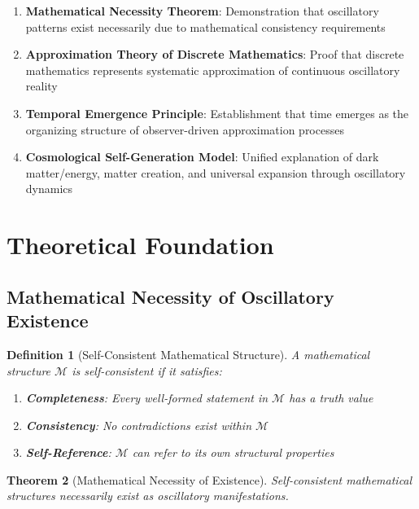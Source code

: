 \documentclass[11pt]{article}
\newtheorem{theorem}{Theorem}[section]
\newtheorem{definition}[theorem]{Definition}
\theoremstyle{remark}
\begin{document}
\begin{enumerate}
\item \textbf{Mathematical Necessity Theorem}: Demonstration that oscillatory patterns exist necessarily due to mathematical consistency requirements
\item \textbf{Approximation Theory of Discrete Mathematics}: Proof that discrete mathematics represents systematic approximation of continuous oscillatory reality
\item \textbf{Temporal Emergence Principle}: Establishment that time emerges as the organizing structure of observer-driven approximation processes
\item \textbf{Cosmological Self-Generation Model}: Unified explanation of dark matter/energy, matter creation, and universal expansion through oscillatory dynamics
\end{enumerate}

\section{Theoretical Foundation}

\subsection{Mathematical Necessity of Oscillatory Existence}

\begin{definition}[Self-Consistent Mathematical Structure]
A mathematical structure $\mathcal{M}$ is self-consistent if it satisfies:
\begin{enumerate}
\item \textbf{Completeness}: Every well-formed statement in $\mathcal{M}$ has a truth value
\item \textbf{Consistency}: No contradictions exist within $\mathcal{M}$
\item \textbf{Self-Reference}: $\mathcal{M}$ can refer to its own structural properties
\end{enumerate}
\end{definition}

\begin{theorem}[Mathematical Necessity of Existence]
Self-consistent mathematical structures necessarily exist as oscillatory manifestations.
\end{theorem}
\end{document}

